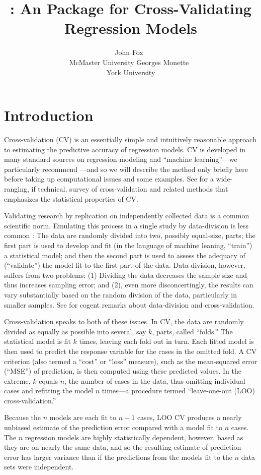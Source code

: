 \documentclass[
]{jss}
\author{
John Fox~\orcidlink{0000-0002-1196-8012}\\McMaster
University \And Georges Monette~\orcidlink{0000-0003-0076-5532}\\York
University
}
\title{\pkg{cv}: An \proglang{R} Package for Cross-Validating Regression
Models}
\begin{document}
\section{Introduction}\label{introduction}

Cross-validation (CV) is an essentially simple and intuitively
reasonable approach to estimating the predictive accuracy of regression
models. CV is developed in many standard sources on regression modeling
and ``machine learning''---we particularly recommend \citet[Secs. 5.1,
5.3]{JamesEtAl:2021}---and so we will describe the method only briefly
here before taking up computational issues and some examples. See
\citet{ArlotCelisse:2010} for a wide-ranging, if technical, survey of
cross-validation and related methods that emphasizes the statistical
properties of CV.

Validating research by replication on independently collected data is a
common scientific norm. Emulating this process in a single study by
data-division is less common \citep[see, e.g.,][]{Barnard:1974}: The
data are randomly divided into two, possibly equal-size, parts; the
first part is used to develop and fit (in the language of machine
leaning, ``train'') a statistical model; and then the second part is
used to assess the adequacy of (``validate'') the model fit to the first
part of the data. Data-division, however, suffers from two problems: (1)
Dividing the data decreases the sample size and thus increases sampling
error; and (2), even more disconcertingly, the results can vary
substantially based on the random division of the data, particularly in
smaller samples. See \citet[Sec. 5.3]{Harrell:2015} for cogent remarks
about data-division and cross-validation.

Cross-validation speaks to both of these issues. In CV, the data are
randomly divided as equally as possible into several, say \(k\), parts,
called ``folds.'' The statistical model is fit \(k\) times, leaving each
fold out in turn. Each fitted model is then used to predict the response
variable for the cases in the omitted fold. A CV criterion (also termed
a ``cost'' or ``loss'' measure), such as the mean-squared error
(``MSE'') of prediction, is then computed using these predicted values.
In the extreme, \(k\) equals \(n\), the number of cases in the data,
thus omitting individual cases and refitting the model \(n\) times---a
procedure termed ``leave-one-out (LOO) cross-validation.''

Because the \(n\) models are each fit to \(n - 1\) cases, LOO CV
produces a nearly unbiased estimate of the prediction error compared
with a model fit to \(n\) cases. The \(n\) regression models are highly
statistically dependent, however, based as they are on nearly the same
data, and so the resulting estimate of prediction error has larger
variance than if the predictions from the models fit to the \(n\) data
sets were independent.
\end{document}
